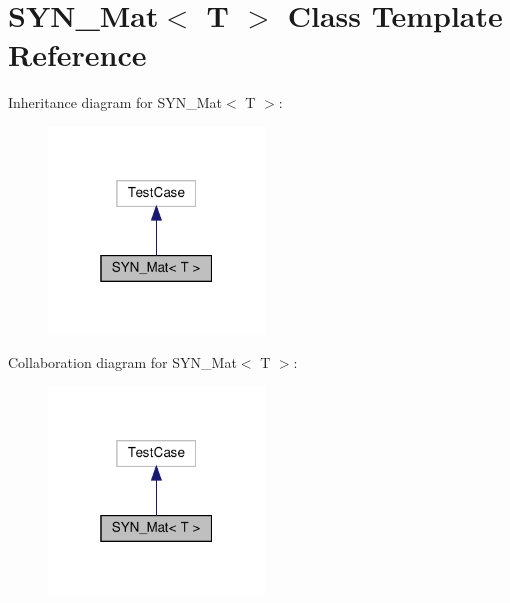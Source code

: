 \hypertarget{classSYN__Mat}{}\section{S\+Y\+N\+\_\+\+Mat$<$ T $>$ Class Template Reference}
\label{classSYN__Mat}


Inheritance diagram for S\+Y\+N\+\_\+\+Mat$<$ T $>$\+:
\nopagebreak
\begin{figure}[H]
\begin{center}
\leavevmode
\includegraphics[width=163pt]{classSYN__Mat__inherit__graph}
\end{center}
\end{figure}


Collaboration diagram for S\+Y\+N\+\_\+\+Mat$<$ T $>$\+:
\nopagebreak
\begin{figure}[H]
\begin{center}
\leavevmode
\includegraphics[width=163pt]{classSYN__Mat__coll__graph}
\end{center}
\end{figure}
